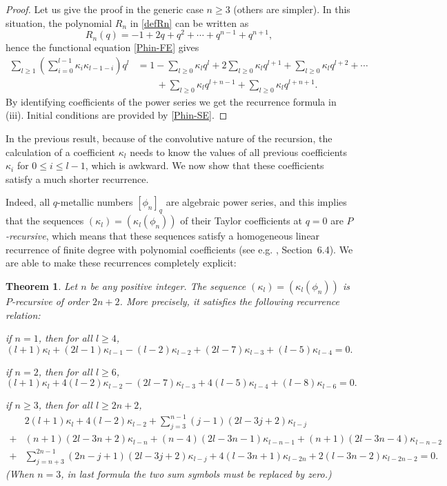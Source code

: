 \documentclass[11pt,reqno]{amsart}
\theoremstyle{plain}
\newtheorem{theoreme}[lemme]{Theorem}
\theoremstyle{definition}
\numberwithin{figure}{section}
\numberwithin{table}{section}
\numberwithin{equation}{section}
\newcommand\ka{\kappa}
\begin{document}
\begin{proof}
Let us give the proof in the generic case $n≥3$ (others are simpler). In this situation, the polynomial $R_n$ in \eqref{defRn} can be written as
\begin{equation*}
R_n(q)=-1+2q+q^2+\cdots+q^{n-1}+q^{n+1},
\end{equation*}
hence the functional equation \eqref{Phin-FE} gives
\begin{align*}
\sum_{l≥1}\left(\sum_{i=0}^{l-1}\ka_i\ka_{l-1-i}\right)q^l
&=1-\sum_{l≥0}\ka_l q^l+2\sum_{l≥0}\ka_l q^{l+1}+\sum_{l≥0}\ka_l q^{l+2}+\cdots\\
&\qquad+\sum_{l≥0}\ka_l q^{l+n-1}+\sum_{l≥0}\ka_l q^{l+n+1}.
\end{align*}
By identifying coefficients of the power series we get the recurrence formula in (iii). Initial conditions are provided by \eqref{Phin-SE}.
\end{proof}

In the previous result, because of the convolutive nature of the recursion, the calculation of a coefficient $\ka_l$ needs to know the values of all previous coefficients $\ka_i$ for $0≤i≤l-1$, which is awkward. We now show that these coefficients satisfy a much shorter recurrence.

Indeed, all $q$-metallic numbers $[\phi_n]_q$ are algebraic power series, and this implies that the sequences $(\ka_l)=(\ka_l(\phi_n))$ of their Taylor coefficients at $q=0$ are \emph{$P$-recursive}, which means that these sequences satisfy a homogeneous linear recurrence of finite degree with polynomial coefficients (see e.g. \cite{StanleyEC2}, Section~6.4). We are able to make these recurrences completely explicit:

\begin{theoreme} \label{rec2}
Let $n$ be any positive integer. The sequence $(\ka_l)=(\ka_l(\phi_n))$ is $P$-recursive of order $2n+2$. More precisely, it satisfies the following recurrence relation:
\begin{rom}
\item if $n=1$, then for all $l≥4$,
\begin{equation*}
(l+1)\ka_l+(2l-1)\ka_{l-1}-(l-2)\ka_{l-2}+(2l-7)\ka_{l-3}+(l-5)\ka_{l-4}=0.
\end{equation*}
\item if $n=2$, then for all $l≥6$,
\begin{equation*}
(l+1)\ka_l+4(l-2)\ka_{l-2}-(2l-7)\ka_{l-3}+4(l-5)\ka_{l-4}+(l-8)\ka_{l-6}=0.
\end{equation*}
\item if $n≥3$, then for all $l≥2n+2$,
\begin{align*}
&2(l+1)\ka_l+4(l-2)\ka_{l-2}+\sum_{j=3}^{n-1}(j-1)(2l-3j+2)\ka_{l-j}\\
+&(n+1)(2l-3n+2)\ka_{l-n}+(n-4)(2l-3n-1)\ka_{l-n-1}+(n+1)(2l-3n-4)\ka_{l-n-2}\\
+&\sum_{j=n+3}^{2n-1}(2n-j+1)(2l-3j+2)\ka_{l-j}
+4(l-3n+1)\ka_{l-2n}+2(l-3n-2)\ka_{l-2n-2}=0.
\end{align*}
(When $n=3$, in last formula the two sum symbols must be replaced by zero.)
\end{rom}
\end{theoreme}
\end{document}
